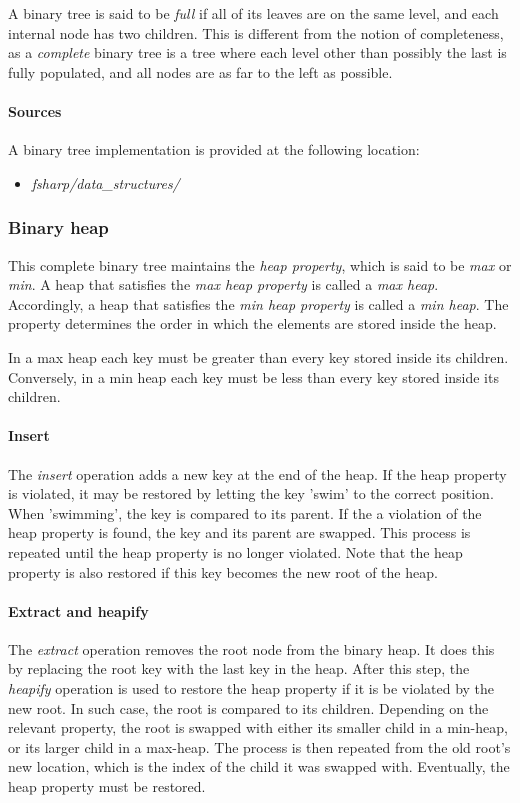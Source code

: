 \documentclass{article}
\begin{document}
A binary tree is said to be {\em full} if all of its leaves are on the same level,
and each internal node has two children. This is different from the notion of completeness,
as a {\em complete} binary tree is a tree where each level other than possibly the last is fully populated,
and all nodes are as far to the left as possible.

\paragraph{Sources}
A binary tree implementation is provided at the following location:
\begin{itemize}
\item{{\em fsharp/data\_structures/}}
\end{itemize}


\subsubsection{Binary heap}
This complete binary tree maintains the {\em heap property}, which is said to be {\em max} or {\em min}.
A heap that satisfies the {\em max heap property} is called a {\em max heap}.
Accordingly, a heap that satisfies the {\em min heap property} is called a {\em min heap}.
The property determines the order in which the elements are stored inside the heap.

In a max heap each key must be greater than every key stored inside its children.
Conversely, in a min heap each key must be less than every key stored inside its children.

\paragraph{Insert}
The {\em insert} operation adds a new key at the end of the heap. If the heap property is violated,
it may be restored by letting the key 'swim' to the correct position. When 'swimming', the key
is compared to its parent. If the a violation of the heap property is found, the key and its parent
are swapped. This process is repeated until the heap property is no longer violated. Note that the
heap property is also restored if this key becomes the new root of the heap.

\paragraph{Extract and heapify}
The {\em extract} operation removes the root node from the binary heap. It does this by replacing
the root key with the last key in the heap. After this step, the {\em heapify} operation is used to
restore the heap property if it is be violated by the new root. In such case, the root is compared
to its children. Depending on the relevant property, the root is swapped with either its smaller child in a
min-heap, or its larger child in a max-heap. The process is then repeated from the old root's new location,
which is the index of the child it was swapped with. Eventually, the heap property must be restored.
\end{document}
